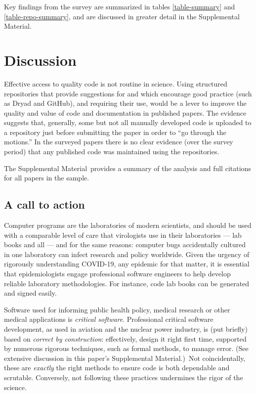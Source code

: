 \documentclass[10pt,letterpaper]{article}
\def\supplement{Supplemental Material}
\begin{document}
Key findings from the survey are summarized in tables \ref{table-summary} and \ref{table-repo-summary}, and are discussed in greater detail in the \supplement. 

\section{Discussion}
Effective access to quality code is not routine in science. Using structured repositories that provide suggestions for and which encourage good practice (such as Dryad and GitHub), and requiring their use, would be a lever to improve the quality and value of code and documentation in published papers. The evidence suggests that, generally, some but not all manually developed code is uploaded to a repository just before submitting the paper in order to ``go through the motions.'' In the surveyed papers there is no clear evidence (over the survey period) that any published code was maintained using the repositories.

The \supplement\ provides a summary of the analysis and full citations for all papers in the sample.

\subsection{A call to action}\label{summary}
Computer programs are the laboratories of modern scientists, and should be used with a comparable level of care that virologists use in their laboratories --- lab books and all \cite{notebooks} --- and for the same reasons: computer bugs accidentally cultured in one laboratory can infect research and policy worldwide. Given the urgency of rigorously understanding COVID-19, any epidemic for that matter, it is essential that epidemiologists engage professional software engineers to help develop reliable laboratory methodologies. For instance, code lab books can be generated and signed easily.

Software used for informing public health policy, medical research or other medical applications is \emph{critical software}. Professional critical software development, as used in aviation and the nuclear power industry, is (put briefly) based on \emph{correct by construction}: \cite{cbc} effectively, design it right first time, {supported by numerous rigorous techniques, such as formal methods, to manage error. (See extensive discussion in this paper's \supplement.)}\ Not coincidentally, these are \emph{exactly\/} the right methods to ensure code is both dependable and scrutable. Conversely, not following these practices undermines the rigor of the science.
\end{document}
